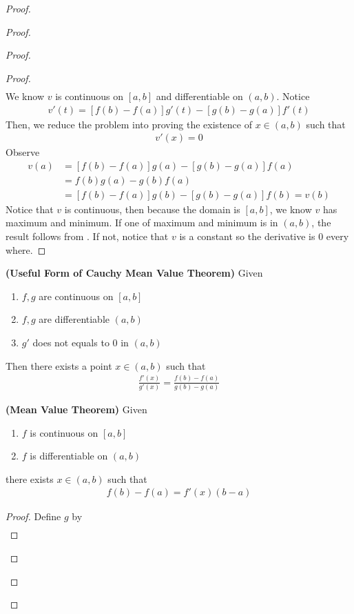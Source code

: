 \documentclass{report}
\begin{document}
\begin{proof}
\begin{proof}
\begin{proof}
\begin{proof}
\begin{align*}
\end{align*}
We know $v$ is continuous on $[a,b]$ and differentiable on $(a,b)$. Notice 
\begin{align*}
v'(t)=[f(b)-f(a)]g'(t)-[g(b)-g(a)]f'(t)
\end{align*}
Then, we reduce the problem into proving the existence of $x\in (a,b)$ such that 
\begin{align*}
v'(x)=0
\end{align*}
Observe  
\begin{align*}
v(a)&=[f(b)-f(a)]g(a)-[g(b)-g(a)]f(a)\\
&=f(b)g(a)-g(b)f(a)\\
&=[f(b)-f(a)]g(b)-[g(b)-g(a)]f(b)=v(b)
\end{align*}
Notice that $v$ is continuous, then because the domain is $[a,b]$, we know $v$ has maximum and minimum. If one of maximum and minimum is in $(a,b)$, the result follows from . If not, notice that $v$ is a constant so the derivative is  $0$ every where.  
\end{proof}
\begin{corollary}
\label{6.2.4}
\textbf{(Useful Form of Cauchy Mean Value Theorem)} Given 
\begin{enumerate}[label=(\alph*)]
  \item $f,g$ are continuous on $[a,b]$ 
  \item $f,g$ are differentiable  $(a,b)$ 
  \item $g'$ does not equals to $0$ in  $(a,b)$
\end{enumerate}
Then there exists a point $x\in (a,b)$ such that 
\begin{align*}
\frac{f'(x)}{g'(x)}=\frac{f(b)-f(a)}{g(b)-g(a)}
\end{align*}
\end{corollary}
\begin{corollary}
\label{6.2.5}
\textbf{(Mean Value Theorem)} Given 
\begin{enumerate}[label=(\alph*)]
  \item $f$ is continuous on $[a,b]$ 
  \item $f$ is differentiable on  $(a,b)$
\end{enumerate}
there exists $x\in (a,b)$ such that 
\begin{align*}
f(b)-f(a)=f'(x)(b-a)
\end{align*}
\end{corollary}
\begin{proof}
Define $g$ by 
 \begin{align*}

\end{align*}
\end{proof}
\end{proof}
\end{proof}
\end{proof}
\end{document}

